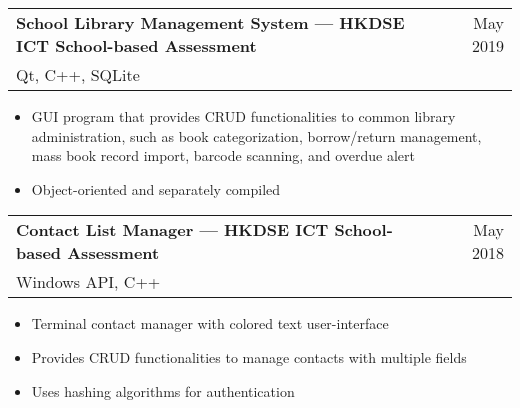 \documentclass{article}
\makeatletter
\newcommand{\jobTitle}[3]{
    \vspace{0.3cm}
    \begin{tabular*}{1\textwidth}{||l@{\extracolsep{\fill}}r}
        \textbf{#1} & #2\\
        #3 &
    \end{tabular*}
}
\makeatother
\begin{document}
\jobTitle
{School Library Management System --- HKDSE ICT School-based Assessment}
{May 2019}
{Qt, C++, SQLite}
\begin{itemize}
    \item GUI program that provides CRUD functionalities to common library administration, such as book categorization, borrow/return management, mass book record import, barcode scanning, and overdue alert
    \item Object-oriented and separately compiled
\end{itemize}

\jobTitle
{Contact List Manager --- HKDSE ICT School-based Assessment}
{May 2018}
{Windows API, C++}
\begin{itemize}
    \item Terminal contact manager with colored text user-interface
    \item Provides CRUD functionalities to manage contacts with multiple fields
    \item Uses hashing algorithms for authentication
\end{itemize}
\end{document}
